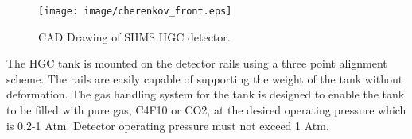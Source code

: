 \documentclass[12pt]{article}
\begin{document}
% 
% 
% 
% 
% 
% 
% 








\begin{figure}[ht]
\centering
\texttt{[image: image/cherenkov\_front.eps]}
\caption{CAD Drawing of SHMS HGC detector. \label{fig:hgc}}
\end{figure}



The HGC tank is mounted on the detector rails using a three point alignment scheme. The rails are easily capable of supporting the weight of the tank without deformation. The gas handling system for the tank is designed to enable the tank to be filled with pure gas, C4F10 or CO2, at the desired operating pressure which is 0.2-1 Atm. Detector operating pressure must not exceed 1 Atm.  
\end{document}
